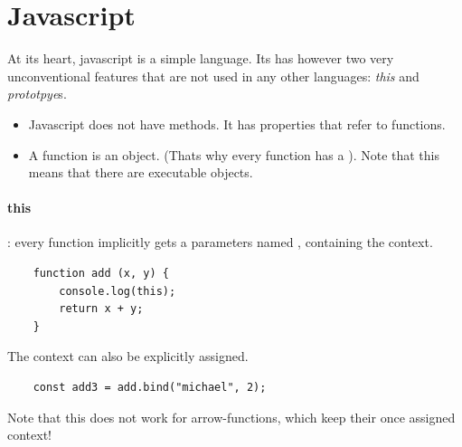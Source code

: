 \section{Javascript}
At its heart, javascript is a simple language. Its has however two very unconventional features that are not used in any other languages: \emph{this} and \emph{prototpye}s.  

\begin{itemize}
    \item Javascript does not have methods. It has properties that refer to functions.
    \item A function is an object. (Thats why every function has a ). Note that this means that there are executable objects.
\end{itemize}

 \paragraph{this}: every function implicitly gets a parameters named , containing the context. 
\begin{lstlisting}
    function add (x, y) {
        console.log(this);
        return x + y;
    }
\end{lstlisting}
The context  can also be explicitly assigned.
\begin{lstlisting}
    const add3 = add.bind("michael", 2);
\end{lstlisting}
Note that this does not work for arrow-functions, which keep their once assigned context!


